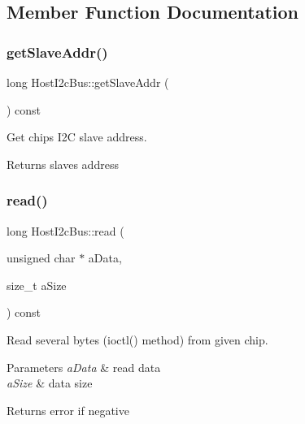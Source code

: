 \subsection{Member Function Documentation}
\mbox{\label{classHostI2cBus_a61dde8f92a1d4df552732d16e803934e}} 
\subsubsection{\texorpdfstring{get\+Slave\+Addr()}{getSlaveAddr()}}
{\footnotesize\ttfamily long Host\+I2c\+Bus\+::get\+Slave\+Addr (\begin{DoxyParamCaption}{ }\end{DoxyParamCaption}) const}



Get chip\textquotesingle{}s I2C slave address. 

\begin{DoxyReturn}{Returns}
slave\textquotesingle{}s address 
\end{DoxyReturn}
\mbox{\label{classHostI2cBus_adb02300bf8aacf65e169f84122848818}} 
\subsubsection{\texorpdfstring{read()}{read()}}
{\footnotesize\ttfamily long Host\+I2c\+Bus\+::read (\begin{DoxyParamCaption}\item[{unsigned char $\ast$}]{a\+Data,  }\item[{size\+\_\+t}]{a\+Size }\end{DoxyParamCaption}) const}



Read several bytes (ioctl() method) from given chip. 


\begin{DoxyParams}{Parameters}
{\em a\+Data} & read data \\
\hline
{\em a\+Size} & data size\\
\hline
\end{DoxyParams}
\begin{DoxyReturn}{Returns}
error if negative 
\end{DoxyReturn}
\mbox{\label{classHostI2cBus_a797e010bb0530a22c8f3e98fe37d9e2b}} 
